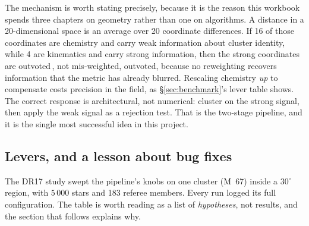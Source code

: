 The mechanism is worth stating precisely, because it is the reason this
workbook spends three chapters on geometry rather than one on algorithms. A
distance in a 20-dimensional space is an average over 20 coordinate
differences. If 16 of those coordinates are chemistry and carry weak
information about cluster identity, while 4 are kinematics and carry strong
information, then the strong coordinates are outvoted$\,$, not mis-weighted,
outvoted, because no reweighting recovers information that the metric has
already blurred. Rescaling chemistry \emph{up} to compensate costs precision in
the field, as \S\ref{sec:benchmark}'s lever table shows. The correct response
is architectural, not numerical: cluster on the strong signal, then apply the
weak signal as a rejection test. That is the two-stage pipeline, and it is the
single most successful idea in this project.

\subsection{Levers, and a lesson about bug fixes}

The DR17 study swept the pipeline's knobs on one cluster (M~67) inside a
$30^\circ$ region, with $5\,000$ stars and 183 referee members. Every run
logged its full configuration. The table is worth reading as a list of
\emph{hypotheses}, not results, and the section that follows explains why.


